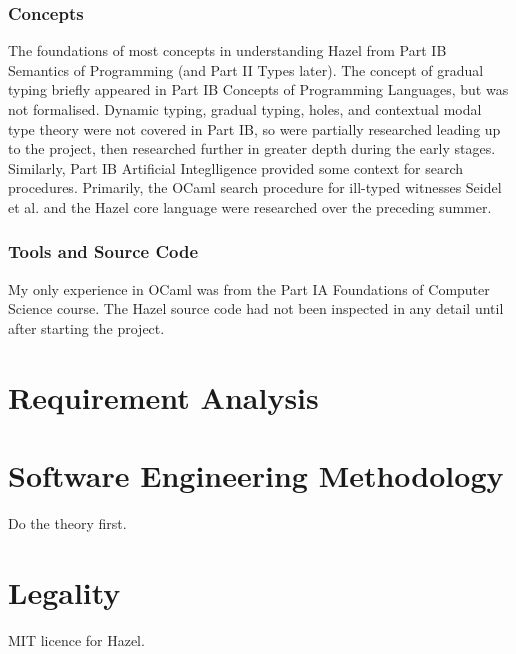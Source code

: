 \subsubsection{Concepts}
The foundations of most concepts in understanding Hazel from Part IB Semantics of Programming (and Part II Types later). The concept of gradual typing briefly appeared in Part IB Concepts of Programming Languages, but was not formalised. Dynamic typing, gradual typing, holes, and contextual modal type theory were not covered in Part IB, so were partially researched leading up to the project, then researched further in greater depth during the early stages. Similarly, Part IB Artificial Integlligence provided some context for search procedures. Primarily, the OCaml search procedure for ill-typed witnesses Seidel et al. \cite{SearchProc} and the Hazel core language \cite{HazelLivePaper} were researched over the preceding summer.

\subsubsection{Tools and Source Code}
My only experience in OCaml was from the Part IA Foundations of Computer Science course. The Hazel source code had not been inspected in any detail until after starting the project.

\section{Requirement Analysis}

\section{Software Engineering Methodology}
Do the theory first.

\section{Legality}
MIT licence for Hazel.